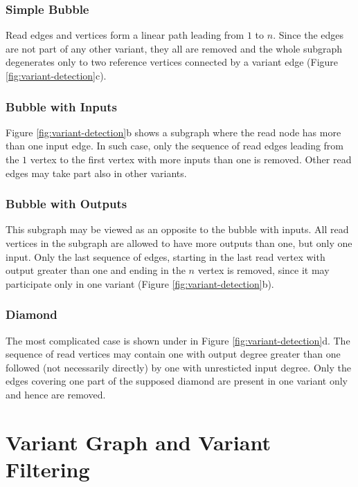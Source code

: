 \subsubsection{Simple Bubble}
\label{subsec:simple-bubble}

Read edges and vertices form a linear path leading from $1$ to $n$. Since the edges are not part of any other variant, they all are removed and the whole subgraph degenerates only to two reference vertices connected by a variant edge (Figure \ref{fig:variant-detection}c).

\subsubsection{Bubble with Inputs}
\label{subsec:bubble-with-inputs}

Figure \ref{fig:variant-detection}b shows a subgraph where the read node has more than one input edge. In such case, only the sequence of read edges leading from the $1$ vertex to the first vertex with more inputs than one is removed. Other read edges may take part also in other variants.

\subsubsection{Bubble with Outputs}
\label{subsec:bubble-with-outputs}

This subgraph may be viewed as an opposite to the bubble with inputs. All read vertices in the subgraph are allowed to have more outputs than one, but only one input. Only the last sequence of edges, starting in the last read vertex with output greater than one and ending in the $n$ vertex is removed, since it may participate only in one variant (Figure \ref{fig:variant-detection}b).

\subsubsection{Diamond}
\label{subsec:diamond}

The most complicated case is shown under in Figure \ref{fig:variant-detection}d. The sequence of read vertices may contain one with output degree greater than one followed (not necessarily directly) by one with unresticted input degree. Only the edges covering one part of the supposed diamond are present in one variant only and hence are removed. 

\section{Variant Graph and Variant Filtering}
\label{sec:variant-graph-and-variant-filtering}

